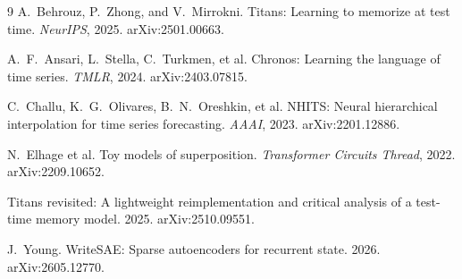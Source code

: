 \documentclass{article}
\begin{document}
\begin{thebibliography}{9}
\small
{}
A.~Behrouz, P.~Zhong, and V.~Mirrokni. Titans: Learning to memorize at test
time. \emph{NeurIPS}, 2025. arXiv:2501.00663.

A.~F.~Ansari, L.~Stella, C.~Turkmen, et al. Chronos: Learning the language of
time series. \emph{TMLR}, 2024. arXiv:2403.07815.

C.~Challu, K.~G.~Olivares, B.~N.~Oreshkin, et al. NHITS: Neural hierarchical
interpolation for time series forecasting. \emph{AAAI}, 2023. arXiv:2201.12886.

N.~Elhage et al. Toy models of superposition. \emph{Transformer Circuits
Thread}, 2022. arXiv:2209.10652.

Titans revisited: A lightweight reimplementation and critical analysis of a
test-time memory model. 2025. arXiv:2510.09551.

J.~Young. WriteSAE: Sparse autoencoders for recurrent state. 2026.
arXiv:2605.12770.
\end{thebibliography}
\end{document}
